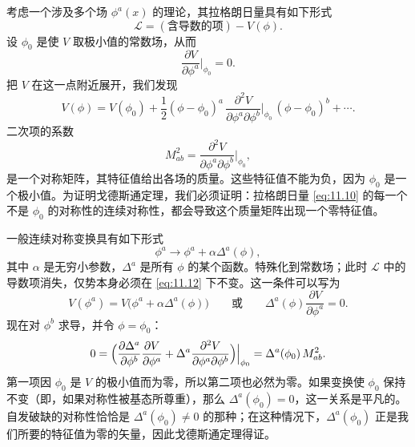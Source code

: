 考虑一个涉及多个场 $\phi^a(x)$ 的理论，其拉格朗日量具有如下形式
\begin{equation}
  \mathcal{L} = (\text{含导数的项}) - V(\phi) .
  \label{eq:11.10}
\end{equation}
设 $\phi_0$ 是使 $V$ 取极小值的常数场，从而
\begin{equation}
  \frac{\partial V}{\partial\phi^a}\Big|_{\phi_0} = 0 .
\end{equation}
把 $V$ 在这一点附近展开，我们发现
\begin{equation}
  V(\phi) = V(\phi_0) + \frac{1}{2}(\phi-\phi_0)^a\,
    \frac{\partial^2 V}{\partial\phi^a\partial\phi^b}\Big|_{\phi_0}\,
    (\phi-\phi_0)^b + \cdots .
\end{equation}
二次项的系数
\begin{equation}
  M^2_{ab} = \frac{\partial^2 V}{\partial\phi^a\partial\phi^b}\Big|_{\phi_0},
  \label{eq:11.11}
\end{equation}
是一个对称矩阵，其特征值给出各场的质量。这些特征值不能为负，因为 $\phi_0$ 是一个极小值。为证明戈德斯通定理，我们必须证明：拉格朗日量 \eqref{eq:11.10} 的每一个不是 $\phi_0$ 的对称性的连续对称性，都会导致这个质量矩阵出现一个零特征值。

一般连续对称变换具有如下形式
\begin{equation}
  \phi^a \to \phi^a + \alpha\Delta^a(\phi),
  \label{eq:11.12}
\end{equation}
其中 $\alpha$ 是无穷小参数，$\Delta^a$ 是所有 $\phi$ 的某个函数。特殊化到常数场；此时 $\mathcal{L}$ 中的导数项消失，仅势本身必须在 \eqref{eq:11.12} 下不变。这一条件可以写为
\begin{equation}
  V(\phi^a) = V\bigl( \phi^a + \alpha\Delta^a(\phi) \bigr)
  \qquad\text{或}\qquad
  \Delta^a(\phi)\frac{\partial V}{\partial\phi^a} = 0 .
\end{equation}
现在对 $\phi^b$ 求导，并令 $\phi = \phi_0$：
\begin{equation}
  0 = \Bigl( \frac{\partial\Delta^a}{\partial\phi^b} \frac{\partial V}
    {\partial\phi^a} + \Delta^a \frac{\partial^2 V}{\partial\phi^a
      \partial\phi^b} \Bigr)\Big|_{\phi_0}
  = \Delta^a(\phi_0)\,M^2_{ab} .
  \label{eq:11.13}
\end{equation}
第一项因 $\phi_0$ 是 $V$ 的极小值而为零，所以第二项也必然为零。如果变换使 $\phi_0$ 保持不变（即，如果对称性被基态所尊重），那么 $\Delta^a(\phi_0) = 0$，这一关系是平凡的。自发破缺的对称性恰恰是 $\Delta^a(\phi_0) \neq 0$ 的那种；在这种情况下，$\Delta^a(\phi_0)$ 正是我们所要的特征值为零的矢量，因此戈德斯通定理得证。

